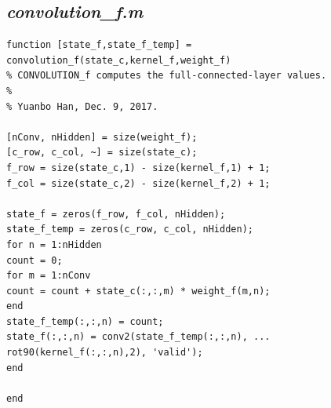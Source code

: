 \documentclass{article}
\begin{document}
\subsection{\emph{convolution\_f.m}}
\begin{lstlisting}
function [state_f,state_f_temp] = convolution_f(state_c,kernel_f,weight_f)
% CONVOLUTION_f computes the full-connected-layer values.
%
% Yuanbo Han, Dec. 9, 2017.

[nConv, nHidden] = size(weight_f);
[c_row, c_col, ~] = size(state_c);
f_row = size(state_c,1) - size(kernel_f,1) + 1;
f_col = size(state_c,2) - size(kernel_f,2) + 1;

state_f = zeros(f_row, f_col, nHidden);
state_f_temp = zeros(c_row, c_col, nHidden);
for n = 1:nHidden
count = 0;
for m = 1:nConv
count = count + state_c(:,:,m) * weight_f(m,n);
end
state_f_temp(:,:,n) = count;
state_f(:,:,n) = conv2(state_f_temp(:,:,n), ...
rot90(kernel_f(:,:,n),2), 'valid');
end

end
\end{lstlisting}
\end{document}
